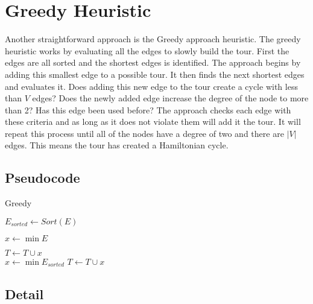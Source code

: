 \documentclass{article}
\begin{document}
\section{Greedy Heuristic}

Another straightforward approach is the Greedy approach heuristic. The greedy
heuristic works by evaluating all the edges to slowly build the tour. First the
edges are all sorted and the shortest edges is identified. The approach begins
by adding this smallest edge to a possible tour. It then finds the next shortest
edges and evaluates it. Does adding this new edge to the tour create a cycle
with less than $V$ edges? Does the newly added edge increase the degree of the
node to more than 2? Has this edge been used before? The approach checks each
edge with these criteria and as long as it does not violate them will add it the
tour. It will repeat this process until all of the nodes have a degree of two
and there are $|V|$ edges. This means the tour has created a Hamiltonian cycle.


\subsection{Pseudocode}

\FloatBarrier

\begin{algorithm}
  \caption{Greedy}
  \label{alg_greedy}
  \begin{algorithmic}[1]

    \State $E_{\textit{sorted}} \gets \textit{Sort}(E)$

    \State $x \gets \min E$

    \State $T \gets T \cup {x}$
    \\
      \State $x \gets \min E_{\textit{sorted}}$
            \State $T \gets T \cup x$
          \EndIf
        \EndIf
      \EndIf
    \EndWhile
    \\
    \EndProcedure
  \end{algorithmic}
\end{algorithm}

\FloatBarrier

\subsection{Detail}
\end{document}
